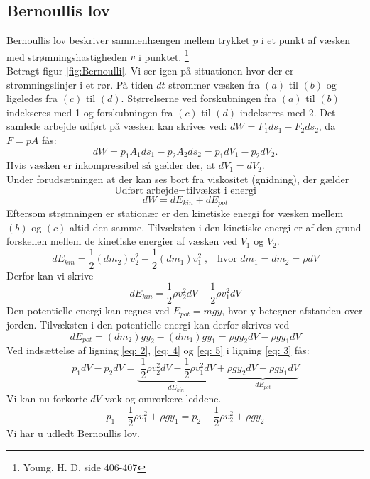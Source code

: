 \documentclass[a4paper, 11pt]{article}
\begin{document}
\subsection{Bernoullis lov}
Bernoullis lov beskriver sammenhængen mellem trykket \(p\) i et punkt af væsken med strømningshastigheden \(v\) i punktet. \footnote{Young. H. D. side 406-407}
\\
Betragt figur \ref*{fig:Bernoulli}. Vi ser igen på situationen hvor der er strømningslinjer i et rør. På tiden \(dt\) strømmer væsken fra \((a)\) til \((b)\) 
og ligeledes fra \((c)\) til \((d)\). Størrelserne ved forskubningen fra \((a)\) til \((b)\) indekseres med 1 og  forskubningen fra \((c)\) til \((d)\) indekseres med 2.
Det samlede arbejde udført på væsken kan skrives ved: \(dW=F_1ds_1-F_2ds_2\), da \(F=pA\) fås:
\begin{equation}
    \label{eq: 2}
    dW=p_1A_1ds_1-p_2A_2ds_2=p_1dV_1-p_2dV_2.
\end{equation}
Hvis væsken er inkompressibel så gælder der, at \(dV_1=dV_2\).\\
Under forudsætningen at der kan ses bort fra viskositet (gnidning), der gælder
\[\text{Udført arbejde} = \text{tilvækst i energi}\]
\begin{equation}
    \label{eq: 3}
    dW=dE_{kin}+dE_{pot}
\end{equation}
Eftersom strømningen er stationær er den kinetiske energi for væsken mellem \((b)\) og \((c)\) altid den samme.
Tilvæksten i den kinetiske energi er af den grund forskellen mellem de kinetiske energier af væsken ved \(V_1\) og \(V_2\).
\[dE_{kin}=\frac{1}{2}(dm_2)v_2^2-\frac{1}{2}(dm_1)v_1^2\;,\;\;\; \text{hvor } dm_1=dm_2=\rho dV\]
Derfor kan vi skrive
\begin{equation}
    \label{eq: 4}
    dE_{kin}=\frac{1}{2}\rho v_2^2 dV-\frac{1}{2}\rho v_1^2 dV
\end{equation}
Den potentielle energi kan regnes ved \(E_{pot}=mgy\), hvor y betegner afstanden over jorden. Tilvæksten i den potentielle energi kan derfor skrives ved
\begin{equation}
    \label{eq: 5}
    dE_{pot}=(dm_2)gy_2-(dm_1)gy_1 = \rho g y_2 dV-\rho g y_1 dV
\end{equation}
Ved indsættelse af ligning \ref*{eq: 2}, \ref*{eq: 4} og \ref*{eq: 5} i ligning \ref{eq: 3} fås:
\[p_1dV-p_2dV=\underbrace{\;\frac{1}{2}\rho v_2^2dV - \frac{1}{2} \rho v_1^2dV}_{dE_{kin}} + \underbrace{\rho g y_2 dV - \rho g y_1 dV}_{dE_{pot}}\]
Vi kan nu forkorte \(dV\) væk og omrorkere leddene.
\begin{equation}
    \label{eq: Bernoullis}
    p_1+\frac{1}{2} \rho v_1^2+\rho g y_1 = p_2+\frac{1}{2} \rho v_2^2+\rho gy_2
\end{equation}
Vi har u udledt Bernoullis lov.
\end{document}
